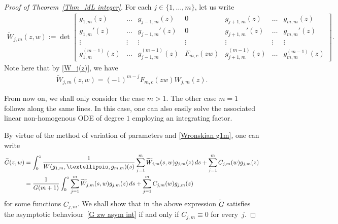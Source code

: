 \documentclass[11pt]{article}
\numberwithin{equation}{section}
\numberwithin{equation}{section}
\newcommand{\1}{\chi}
\begin{document}
\begin{proof}[Proof of Theorem~\ref{Thm_ML integer}]
	For each $j \in \{1,\dots, m\}$, let us write
	\begin{gather*}
		\widetilde{W}_{j,m}(z,w):=\det
		\begin{bmatrix}
			g_{1,m}(z) & \dots & g_{j-1,m}(z) & 0 & g_{j+1,m}(z) & \dots & g_{m,m}(z)
			\\
			g_{1,m}'(z) & \dots & g_{j-1,m}'(z) & 0 & g_{j+1,m}'(z) & \dots & g_{m,m}'(z)
			\\
			\vdots & \vdots & \vdots & \vdots & \vdots & \vdots & \vdots
			\\
			g_{1,m}^{(m-1)}(z) & \dots & g_{j-1,m}^{(m-1)}(z) & F_{m,c}(zw) & g_{j+1,m}^{(m-1)}(z) & \dots & g_{m,m}^{(m-1)}(z)
		\end{bmatrix}.
	\end{gather*}
	Note here that by \eqref{W_j(z)}, we have
	\begin{gather} \label{Wj zw F Wj}
		\widetilde{W}_{j,m}(z,w)=(-1)^{m-j} F_{m,c}(zw) W_{j,m}(z).
	\end{gather}
	
	From now on, we shall only consider the case $m>1$. The other case $m=1$ follows along the same lines. In this case, one can also easily solve the associated linear non-homogenous ODE of degree $1$ employing an integrating factor.
	
	By virtue of the method of variation of parameters and \eqref{Wronskian g1m}, one can write
	\begin{align*}
			\widetilde{G}(z,w)&= \int_0^z \frac{1}{W(g_{1,m},\dots,g_{m,m})(s)}\sum_{j=1}^{m} 	\widetilde{W}_{j,m}(s,w) g_{j,m}(z)\,{\rm d}s+ \sum_{j=1}^{m} C_{j,m}(w) g_{j,m}(z)
			\\
			&=\frac{1}{G(m+1)}\int_0^z \sum_{j=1}^{m} 	\widetilde{W}_{j,m}(s,w) g_{j,m}(z)\,{\rm d}s+ \sum_{j=1}^{m} C_{j,m}(w) g_{j,m}(z)
	\end{align*}
	for some functions $C_{j,m}$. We shall show that in the above expression $\widetilde{G}$ satisfies the asymptotic behaviour~\eqref{G zw asym int} if and only if $C_{j,m} \equiv 0$ for every~$j$.
	

\end{proof}
\end{document}
